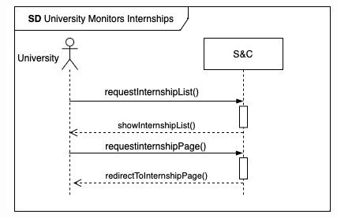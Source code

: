 \begin{enumerate}[label=\textbf{[US\arabic*]}, left = 0pt, align = left, resume]
\begin{longtable}{|l|p{11cm}|}
            \end{longtable}
            
            \begin{figure}[h!]
                \centering        \includegraphics{RASD/Images/UseCases/UniversityMonitorsInternships.drawio.png}
                \label{fig:example}
            \end{figure}

        \end{enumerate}
            
            
                
                
                
